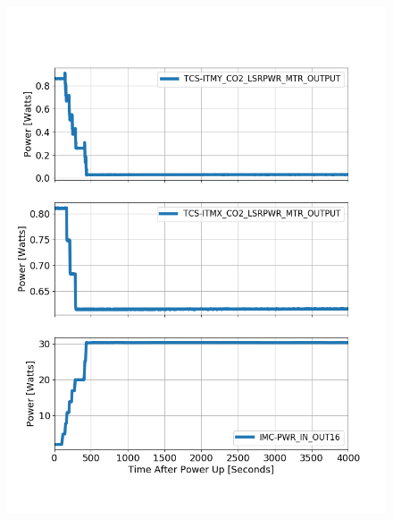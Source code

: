 	\begin{figure}[t!]
		\centering
		\includegraphics[width=0.35\textheight]{../Figures/1231726400TCS_and_PSL_powerup.png}

\end{figure}
